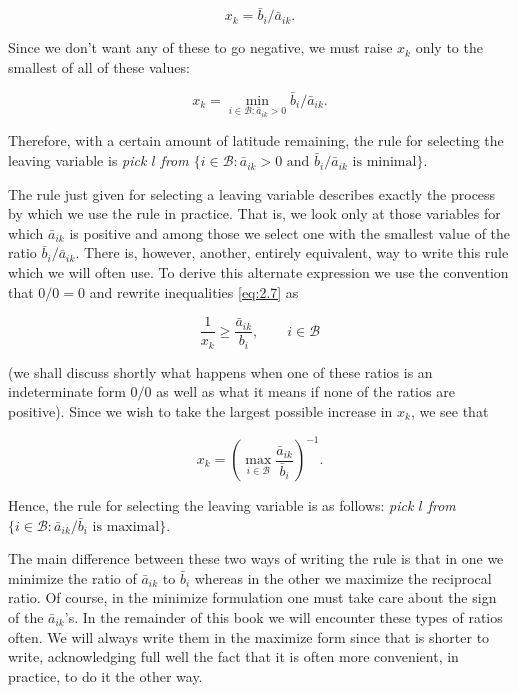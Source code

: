\documentclass{article}
\begin{document}
    \[ x_{k} = \bar{b}_{i}/\bar{a}_{ik}. \]
    
    Since we don't want any of these to go negative, we must raise \( x_{k} \) only to the smallest of all of these values:
    
    \[ x_{k} = \min_{i \in \mathcal{B} : \bar{a}_{ik} > 0} \bar{b}_{i}/\bar{a}_{ik}. \]
    
    Therefore, with a certain amount of latitude remaining, the rule for selecting the leaving variable is \emph{pick \( l \) from \( \{i \in \mathcal{B} : \bar{a}_{ik} > 0 \text{ and } \bar{b}_{i}/\bar{a}_{ik} \text{ is minimal}\} \)}.
    
    The rule just given for selecting a leaving variable describes exactly the process by which we use the rule in practice. That is, we look only at those variables for which \( \bar{a}_{ik} \) is positive and among those we select one with the smallest value of the ratio \( \bar{b}_{i}/\bar{a}_{ik} \). There is, however, another, entirely equivalent, way to write this rule which we will often use. To derive this alternate expression we use the convention that \( 0/0 = 0 \) and rewrite inequalities \eqref{eq:2.7} as
    
    \[ \frac{1}{x_{k}} \geq \frac{\bar{a}_{ik}}{b_{i}}, \qquad i \in \mathcal{B} \]
    
    (we shall discuss shortly what happens when one of these ratios is an indeterminate form \( 0/0 \) as well as what it means if none of the ratios are positive). Since we wish to take the largest possible increase in \( x_{k} \), we see that
    
    \[ x_{k} = \left( \max_{i \in \mathcal{B}} \frac{\bar{a}_{ik}}{\bar{b}_{i}} \right)^{-1}. \]
    
    Hence, the rule for selecting the leaving variable is as follows: \emph{pick \( l \) from \( \{i \in \mathcal{B} : \bar{a}_{ik}/\bar{b}_{i} \text{ is maximal}\} \)}.
    
    The main difference between these two ways of writing the rule is that in one we minimize the ratio of \( \bar{a}_{ik} \) to \( \bar{b}_{i} \) whereas in the other we maximize the reciprocal ratio. Of course, in the minimize formulation one must take care about the sign of the \( \bar{a}_{ik} \)'s. In the remainder of this book we will encounter these types of ratios often. We will always write them in the maximize form since that is shorter to write, acknowledging full well the fact that it is often more convenient, in practice, to do it the other way.
    
\end{document}
